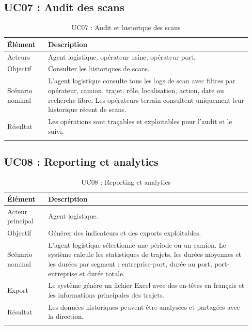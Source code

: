 \subsection{UC07 : Audit des scans}

\begin{longtable}{|p{4cm}|p{10cm}|}
\hline
\textbf{Élément} & \textbf{Description} \\
\hline
\endhead

Acteurs & Agent logistique, opérateur usine, opérateur port. \\
\hline
Objectif & Consulter les historiques de scans. \\
\hline
Scénario nominal & L'agent logistique consulte tous les logs de scan avec filtres par opérateur, camion, trajet, rôle, localisation, action, date ou recherche libre. Les opérateurs terrain consultent uniquement leur historique récent de scans. \\
\hline
Résultat & Les opérations sont traçables et exploitables pour l'audit et le suivi. \\
\hline
\caption{UC07 : Audit et historique des scans}
\label{tab:uc-audit-scans}
\end{longtable}

\subsection{UC08 : Reporting et analytics}

\begin{longtable}{|p{4cm}|p{10cm}|}
\hline
\textbf{Élément} & \textbf{Description} \\
\hline
\endhead

Acteur principal & Agent logistique. \\
\hline
Objectif & Générer des indicateurs et des exports exploitables. \\
\hline
Scénario nominal & L'agent logistique sélectionne une période ou un camion. Le système calcule les statistiques de trajets, les durées moyennes et les durées par segment : entreprise-port, durée au port, port-entreprise et durée totale. \\
\hline
Export & Le système génère un fichier Excel avec des en-têtes en français et les informations principales des trajets. \\
\hline
Résultat & Les données historiques peuvent être analysées et partagées avec la direction. \\
\hline
\caption{UC08 : Reporting et analytics}
\label{tab:uc-reporting}
\end{longtable}

